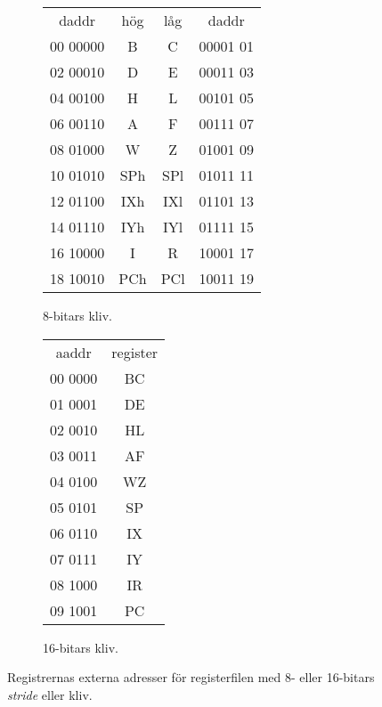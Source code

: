 \documentclass[main.tex]{subfiles}
\begin{document}
\begin{figure}[b!]
    \centering
    \begin{subfigure}{0.5\textwidth}
        \center
        \ttfamily
        \begin{tabular}{r|c|c|l}
            \multicolumn{1}{c}{daddr} &
            \multicolumn{1}{c}{hög} & \multicolumn{1}{c}{låg} &
            \multicolumn{1}{c}{daddr} \\ \cline{2-3}
            00 00000 & B   & C   & 00001 01 \\ \cline{2-3}
            02 00010 & D   & E   & 00011 03 \\ \cline{2-3}
            04 00100 & H   & L   & 00101 05 \\ \cline{2-3}
            06 00110 & A   & F   & 00111 07 \\ \cline{2-3}
            08 01000 & W   & Z   & 01001 09 \\ \cline{2-3}
            10 01010 & SPh & SPl & 01011 11 \\ \cline{2-3}
            12 01100 & IXh & IXl & 01101 13 \\ \cline{2-3}
            14 01110 & IYh & IYl & 01111 15 \\ \cline{2-3}
            16 10000 & I   & R   & 10001 17 \\ \cline{2-3}
            18 10010 & PCh & PCl & 10011 19 \\ \cline{2-3}
        \end{tabular}
        \caption{8-bitars kliv.}
        \label{fig:rfext8}
    \end{subfigure}%
    \begin{subfigure}{0.5\textwidth}
        \center
        \ttfamily
        \begin{tabular}{r|c|}
            \multicolumn{1}{c}{aaddr} &
            \multicolumn{1}{c}{register} \\ \cline{2-2}
            00 0000 & BC \\ \cline{2-2}
            01 0001 & DE \\ \cline{2-2}
            02 0010 & HL \\ \cline{2-2}
            03 0011 & AF \\ \cline{2-2}
            04 0100 & WZ \\ \cline{2-2}
            05 0101 & SP \\ \cline{2-2}
            06 0110 & IX \\ \cline{2-2}
            07 0111 & IY \\ \cline{2-2}
            08 1000 & IR \\ \cline{2-2}
            09 1001 & PC \\ \cline{2-2}
        \end{tabular}
        \caption{16-bitars kliv.}
    \end{subfigure}
    \caption{Registrernas externa adresser för registerfilen med 8- eller
    16-bitars {\it stride} eller kliv.}
    \label{fig:rfext}
\end{figure}
\end{document}
